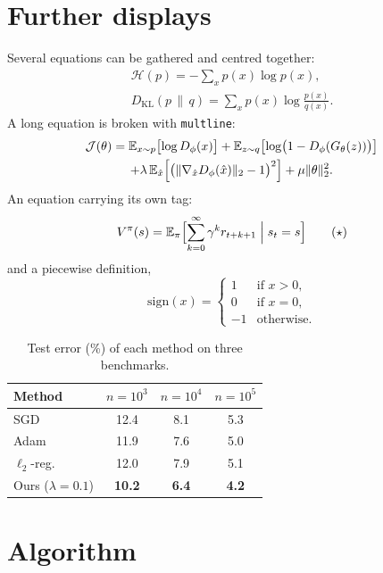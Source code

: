 \section{Further displays}
\proseC
Several equations can be gathered and centred together:
\begin{gather*}
\mathcal{H}(p) = -\sum_{x} p(x) \log p(x),\\
D_{\mathrm{KL}}(p \,\|\, q) = \sum_{x} p(x) \log \frac{p(x)}{q(x)}.
\end{gather*}
A long equation is broken with \texttt{multline}:
\begin{multline}\label{eq:multline}
\mathcal{J}(\theta) = \mathbb{E}_{x \sim p}\bigl[\log D_\phi(x)\bigr] + \mathbb{E}_{z \sim q}\bigl[\log\bigl(1 - D_\phi(G_\theta(z))\bigr)\bigr] \\
+ \lambda\, \mathbb{E}_{\hat{x}}\Bigl[\bigl(\|\nabla_{\hat{x}} D_\phi(\hat{x})\|_2 - 1\bigr)^2\Bigr] + \mu \|\theta\|_2^2.
\end{multline}
\proseA
An equation carrying its own tag:
\begin{equation}
V^\pi(s) = \mathbb{E}_\pi\Bigl[\sum_{k=0}^{\infty} \gamma^k r_{t+k+1} \Bigm| s_t = s\Bigr] \tag{$\star$}
\end{equation}
and a piecewise definition,
\begin{equation}\label{eq:cases}
\mathrm{sign}(x) = \begin{cases} 1 & \text{if } x > 0,\\ 0 & \text{if } x = 0,\\ -1 & \text{otherwise.}\end{cases}
\end{equation}
\proseB

\begin{table}[t]
\centering
\caption{Test error (\%) of each method on three benchmarks.}
\label{tab:res}
\begin{tabular}{lccc}
\toprule
Method & $n = 10^3$ & $n = 10^4$ & $n = 10^5$ \\
\midrule
SGD & 12.4 & 8.1 & 5.3 \\
Adam & 11.9 & 7.6 & 5.0 \\
$\ell_2$-reg. & 12.0 & 7.9 & 5.1 \\
Ours ($\lambda = 0.1$) & \textbf{10.2} & \textbf{6.4} & \textbf{4.2} \\
\bottomrule
\end{tabular}
\end{table}

\section{Algorithm}
\proseA

